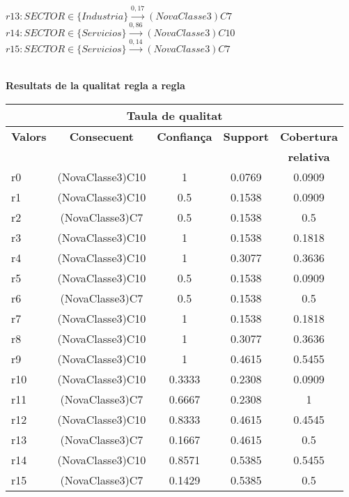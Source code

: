 $r13: SECTOR \in  \{ Industria \} \stackrel{0,17}{\longrightarrow} (NovaClasse3)C7$\\

$r14: SECTOR \in  \{ Servicios \} \stackrel{0,86}{\longrightarrow} (NovaClasse3)C10$\\

$r15: SECTOR \in  \{ Servicios \} \stackrel{0,14}{\longrightarrow} (NovaClasse3)C7$\\

\newpage
\vspace{3ex}
\mbox{ }
\begin{center} \Large \bf Resultats de la qualitat regla a regla \end{center}

\begin{center}
\begin{tabular}{|p{3cm}|c|c|c|c|}
\hline
\multicolumn{5}{|c|}{\bf Taula de qualitat} \\ 
\hline
{\bf Valors} & {\bf Consecuent} & {\bf Confian\c ca} & {\bf Support} & {\bf Cobertura} \\ 
 & {\bf } & {\bf } & {\bf } & {\bf relativa} \\ 
\hline
\hline
r0 & (NovaClasse3)C10 & 1 & 0.0769 & 0.0909 \\ 
\hline
r1 & (NovaClasse3)C10 & 0.5 & 0.1538 & 0.0909 \\ 
\hline
r2 & (NovaClasse3)C7 & 0.5 & 0.1538 & 0.5 \\ 
\hline
r3 & (NovaClasse3)C10 & 1 & 0.1538 & 0.1818 \\ 
\hline
r4 & (NovaClasse3)C10 & 1 & 0.3077 & 0.3636 \\ 
\hline
r5 & (NovaClasse3)C10 & 0.5 & 0.1538 & 0.0909 \\ 
\hline
r6 & (NovaClasse3)C7 & 0.5 & 0.1538 & 0.5 \\ 
\hline
r7 & (NovaClasse3)C10 & 1 & 0.1538 & 0.1818 \\ 
\hline
r8 & (NovaClasse3)C10 & 1 & 0.3077 & 0.3636 \\ 
\hline
r9 & (NovaClasse3)C10 & 1 & 0.4615 & 0.5455 \\ 
\hline
r10 & (NovaClasse3)C10 & 0.3333 & 0.2308 & 0.0909 \\ 
\hline
r11 & (NovaClasse3)C7 & 0.6667 & 0.2308 & 1 \\ 
\hline
r12 & (NovaClasse3)C10 & 0.8333 & 0.4615 & 0.4545 \\ 
\hline
r13 & (NovaClasse3)C7 & 0.1667 & 0.4615 & 0.5 \\ 
\hline
r14 & (NovaClasse3)C10 & 0.8571 & 0.5385 & 0.5455 \\ 
\hline
r15 & (NovaClasse3)C7 & 0.1429 & 0.5385 & 0.5 \\ 
\hline
\hline
\end{tabular}
\end{center} \vfill


